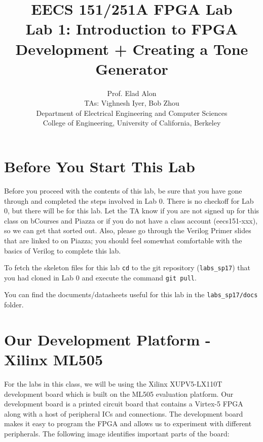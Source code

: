 \documentclass[11pt]{article}
\begin{document}
\title{EECS 151/251A FPGA Lab\\
Lab 1: Introduction to FPGA Development + Creating a Tone Generator}

\author{Prof. Elad Alon \\
TAs: Vighnesh Iyer, Bob Zhou \\Department of Electrical Engineering and Computer Sciences\\
College of Engineering, University of California, Berkeley}
\date{}
\maketitle

\section{Before You Start This Lab}

Before you proceed with the contents of this lab, be sure that you have gone through and completed the steps involved in Lab 0. There is no checkoff for Lab 0, but there will be for this lab. Let the TA know if you are not signed up for this class on bCourses and Piazza or if you do not have a class account (eecs151-xxx), so we can get that sorted out. Also, please go through the Verilog Primer slides that are linked to on Piazza; you should feel somewhat comfortable with the basics of Verilog to complete this lab.

To fetch the skeleton files for this lab \verb|cd| to the git repository (\verb|labs_sp17|) that you had cloned in Lab 0 and execute the command \verb|git pull|.

You can find the documents/datasheets useful for this lab in the \verb|labs_sp17/docs| folder.

\section{Our Development Platform - Xilinx ML505}
For the labs in this class, we will be using the Xilinx XUPV5-LX110T development board which is built on the ML505 evaluation platform. Our development board is a printed circuit board that contains a Virtex-5 FPGA along with a host of peripheral ICs and connections. The development board makes it easy to program the FPGA and allows us to experiment with different peripherals. The following image identifies important parts of the board:
\end{document}
